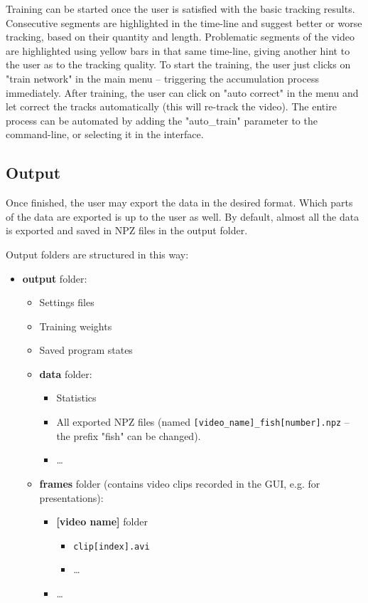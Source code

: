 \documentclass[9pt,lineno]{elife}
\newcommand{\TRex}{\protect\path{TRex}}
\begin{document}
\begin{appendixbox}
Training can be started once the user is satisfied with the basic tracking results. Consecutive segments are highlighted in the time-line and suggest better or worse tracking, based on their quantity and length. Problematic segments of the video are highlighted using yellow bars in that same time-line, giving another hint to the user as to the tracking quality. To start the training, the user just clicks on "train network" in the main menu -- triggering the accumulation process immediately. After training, the user can click on "auto correct" in the menu and let \TRex{} correct the tracks automatically (this will re-track the video). The entire process can be automated by adding the "auto\_train" parameter to the command-line, or selecting it in the interface.

\subsection{Output}

Once finished, the user may export the data in the desired format. Which parts of the data are exported is up to the user as well. By default, almost all the data is exported and saved in NPZ files in the output folder.

Output folders are structured in this way:

\begin{itemize}
\item \textbf{output} folder:
    \begin{itemize}
        \item Settings files
        \item Training weights
        \item Saved program states
        \item \textbf{data} folder:
        \begin{itemize}
            \item Statistics
            \item All exported NPZ files (named \texttt{[video\_name]\_fish[number].npz} -- the prefix "fish" can be changed).
            \item \dots
        \end{itemize}
        \item \textbf{frames} folder (contains video clips recorded in the GUI, e.g. for presentations):
        \begin{itemize}
            \item \textbf{[video name]} folder
            \begin{itemize}
                \item \texttt{clip[index].avi}
                \item \dots
            \end{itemize}
            \item \dots
        \end{itemize}
    \end{itemize}
\end{itemize}


\end{appendixbox}
\end{document}
